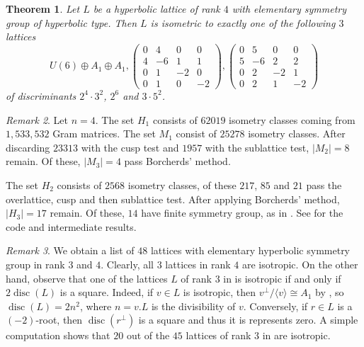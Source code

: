\documentclass[11pt,letterpaper]{amsart}
\DeclareMathOperator{\disc}{disc}
\newtheorem{theorem}{Theorem}[section]
\theoremstyle{definition}
\theoremstyle{remark}
\newtheorem{remark}[theorem]{Remark}
\begin{document}
\begin{theorem} \label{thm:classification.4}
Let $L$ be a hyperbolic lattice of rank $4$ with elementary symmetry group of hyperbolic type. 
Then $L$ is isometric to exactly one of the following $3$ lattices
\[U(6) \oplus A_1 \oplus A_1, 
\begin{pmatrix} 
0 & 4 & 0 & 0\\
 4 & -6 & 1 & 1\\
 0 & 1 & -2 & 0\\
 0 & 1 & 0 & -2
\end{pmatrix},
\begin{pmatrix} 
0 & 5 & 0 & 0\\
 5 & -6 & 2 & 2\\
 0 & 2 & -2 & 1\\
 0 & 2 & 1 & -2
\end{pmatrix}
\]
of discriminants $2^4 \cdot 3^2$, $2^6$ and $3 \cdot 5^2$.
\end{theorem} 
\begin{remark}
Let $n=4$. 
The set $H_1$ consists of $62019$ isometry classes coming from $1,533,532$ Gram matrices.  
The set $M_1$ consist of $25278$ isometry classes. After discarding $23313$ with the cusp test and $1957$ with the sublattice test, $|M_2|=8$ remain. Of these, $|M_3|=4$ pass Borcherds' method. 

The set $H_2$ consists of $2568$ isometry classes,
of these $217$, $85$ and $21$ pass the overlattice, cusp and then sublattice test. After applying Borcherds' method, $|H_3|=17$ remain. Of these, $14$ have finite symmetry group, as in \cite{vinberg.finite.aut.4}. See \cite{intermediate.data} for the code and intermediate results.
\end{remark}


\begin{remark}
We obtain a list of $48$ lattices with elementary hyperbolic symmetry group in rank $3$ and $4$. Clearly, all $3$ lattices in rank $4$ are isotropic. On the other hand, observe that one of the lattices $L$ of rank $3$ in  is isotropic if and only if $2\disc(L)$ is a square. Indeed, if $v\in L$ is isotropic, then $v^\perp/\langle v \rangle \cong A_1$ by , so $\disc(L) = 2n^2$, where $n=v.L$ is the divisibility of $v$. Conversely, if $r\in L$ is a $(-2)$-root, then $\disc(r^\perp)$ is a square and thus it is represents zero. A simple computation shows that $20$ out of the $45$ lattices of rank $3$ in  are isotropic.
\end{remark}
\end{document}
